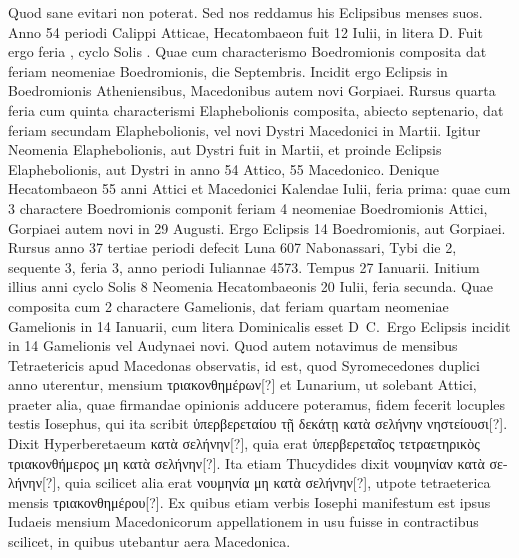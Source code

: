 Quod
sane evitari non poterat.
Sed nos reddamus his Eclipsibus menses suos.
Anno 54 periodi Calippi Atticae, Hecatombaeon fuit 12 Iulii, in litera
D.
Fuit ergo feria , cyclo Solis .
Quae cum characterismo Boedromionis
composita dat feriam  neomeniae Boedromionis,
 die  Septembris.
Incidit ergo Eclipsis in  Boedromionis Atheniensibus,
Macedonibus autem novi Gorpiaei.
Rursus quarta feria cum quinta characterismi
Elaphebolionis composita, abiecto septenario, dat feriam
secundam Elaphebolionis, vel novi Dystri Macedonici in  Martii.
Igitur
Neomenia Elaphebolionis, aut Dystri fuit in  Martii, et proinde
Eclipsis  Elaphebolionis, aut Dystri in anno 54 Attico, 55
Macedonico.
Denique Hecatombaeon 55 anni Attici et Macedonici Kalendae
Iulii, feria prima: quae cum 3 charactere Boedromionis componit
feriam 4 neomeniae Boedromionis Attici, Gorpiaei autem novi in
29 Augusti.
Ergo Eclipsis 14 Boedromionis, aut Gorpiaei.
Rursus anno
37 tertiae periodi defecit Luna 607 Nabonassari, Tybi die 2, sequente
3, feria 3, anno periodi Iuliannae 4573.
Tempus 27 Ianuarii.
Initium
illius anni cyclo Solis 8 Neomenia Hecatombaeonis 20 Iulii, feria
secunda.
Quae composita cum 2 charactere Gamelionis, dat feriam quartam
neomeniae Gamelionis in 14 Ianuarii, cum litera Dominicalis esset
D~C.\ 
Ergo Eclipsis incidit in 14 Gamelionis vel Audynaei novi.
\lnr{24}Quod autem notavimus de mensibus Tetraetericis apud Macedonas
observatis, id est, quod Syromecedones duplici anno uterentur, mensium
\textgreek{τριακονθημέρων[?]}
 et Lunarium, ut solebant Attici, praeter alia, quae firmandae
opinionis adducere poteramus, fidem fecerit locuples testis Iosephus,
qui ita scribit
 \textgreek{ὑπερβερεταίου τῇ δεκάτῃ κατὰ σελήνην νηστείουσι[?]}.
\lnr{27}Dixit Hyperberetaeum
\textgreek{κατὰ σελήνην[?]}, quia erat
 \textgreek{ὑπερβερεταῖος τετραετηρικὸς τριακονθήμερος
μη κατὰ σελήνην[?]}.
Ita etiam Thucydides dixit \textgreek{νουμηνίαν κατὰ σελήνην[?]},
quia scilicet alia erat \textgreek{νουμηνία μη κατὰ σελήνην[?]},
 utpote tetraeterica mensis
\textgreek{τριακονθημέρου[?]}.
Ex quibus etiam verbis Iosephi manifestum est ipsus Iudaeis
mensium Macedonicorum appellationem in usu fuisse in contractibus
scilicet, in quibus utebantur aera Macedonica.


